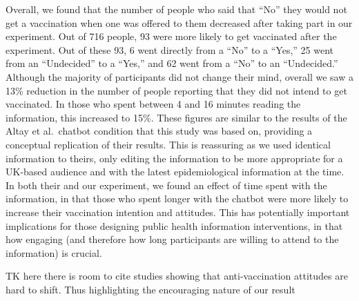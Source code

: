 \documentclass[
  english,
  ,jou,floatsintext]{apa6}
\begin{document}
Overall, we found that the number of people who said that ``No'' they would not get a vaccination when one was offered to them decreased after taking part in our experiment. Out of 716 people, 93 were more likely to get vaccinated after the experiment. Out of these 93, 6 went directly from a ``No'' to a ``Yes,'' 25 went from an ``Undecided'' to a ``Yes,'' and 62 went from a ``No'' to an ``Undecided.'' Although the majority of participants did not change their mind, overall we saw a 13\% reduction in the number of people reporting that they did not intend to get vaccinated. In those who spent between 4 and 16 minutes reading the information, this increased to 15\%. These figures are similar to the results of the Altay et al.~chatbot condition that this study was based on, providing a conceptual replication of their results. This is reassuring as we used identical information to theirs, only editing the information to be more appropriate for a UK-based audience and with the latest epidemiological information at the time. In both their and our experiment, we found an effect of time spent with the information, in that those who spent longer with the chatbot were more likely to increase their vaccination intention and attitudes. This has potentially important implications for those designing public health information interventions, in that how engaging (and therefore how long participants are willing to attend to the information) is crucial.

TK here there is room to cite studies showing that anti-vaccination attitudes are hard to shift. Thus highlighting the encouraging nature of our result
\end{document}
